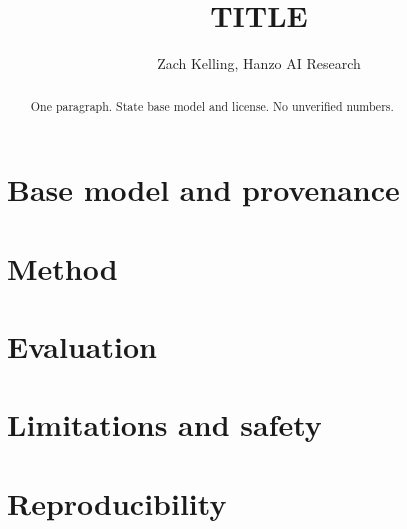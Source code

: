 \documentclass{article}
\title{TITLE}
\author{Zach Kelling, Hanzo AI Research}
\begin{document}
\maketitle
\begin{abstract}One paragraph. State base model and license. No unverified numbers.\end{abstract}
\section{Base model and provenance} %
\section{Method}
\section{Evaluation} %
\section{Limitations and safety} %
\section{Reproducibility} %
\nocite{base-model}
\end{document}

